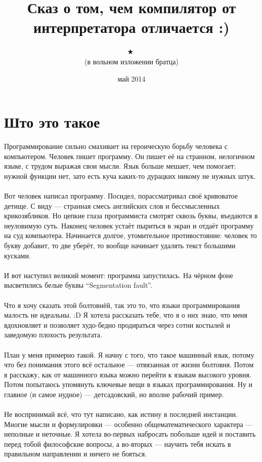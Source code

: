 \documentclass[11pt]{book}
\title{
\small{\textleaf}
\huge{\textleaf}
\huge{\quad}
\large{Сказ о том, чем компилятор от интерпретатора отличается :)}
\huge{\quad}
\huge{\textleaf}
\small{\textleaf}
}
\author{
\small{\textborn} \ 
\small{\APLstar} \ 
\huge{\textborn} \ 
\huge{\APLstar} \ 
\Huge{$\bigstar$} \ 
\huge{\APLstar} \ 
\huge{\textborn} \ 
\small{\APLstar} \ 
\small{\textborn}
\\
\Large (в вольном изложении братца)
\\
\huge{\Bicycle}
}
\date{май 2014}
\begin{document}
\maketitle
\pagebreak

\section*{Што это такое}
Программирование сильно смахивает на героическую борьбу человека с компьютером.
Человек пишет программу. Он пишет её на странном, нелогичном языке, с трудом выражая
свои мысли. Язык больше мешает, чем помогает: нужной функции нет, зато есть
куча каких-то дурацких никому не нужных штук.
\\ \\
Вот человек написал программу. Посидел, порассматривал своё кривоватое детище.
С виду --- странная смесь английских слов и бессмысленных крикозябликов.
Но цепкие глаза программиста смотрят сквозь буквы, въедаются
в неуловимую суть. Наконец человек устаёт пыриться в экран и отдаёт программу
на суд компьютера. Начинается долгое, утомительное противостояние: человек
то букву добавит, то две уберёт, то вообще начинает удалять текст большими кусками.
\\ \\
И вот наступил великий момент: программа запустилась. На чёрном фоне
высветились белые буквы ``Segmentation fault''.
\\ \\
Что я хочу сказать этой болтовнёй, так это то, что языки программирования малость не идеальны. :D
Я хотела рассказать тебе, что я о них знаю, что меня вдохновляет
и позволяет худо-бедно продираться через сотни костылей и заведомую плохость результата.
\\ \\
План у меня примерно такой.
Я начну с того, что такое машинный язык, потому что без понимания этого всё остальное --- отвязанная от жизни болтовня.
Потом я расскажу, как от машинного языка можно перейти к языкам высокого уровня.
Потом попытаюсь упомянуть ключевые вещи в языках программирования.
Ну и главное (и самое нудное) --- детсадовский, но вполне рабочий пример.
\\ \\
Не воспринимай всё, что тут написано, как истину в последней инстанции.
Многие мысли и формулировки --- особенно общематематического характера --- неполные и неточные.
Я хотела во-первых набросать побольше идей и поставить перед тобой философские вопросы,
а во-вторых --- научить тебя искать в правильном направлении и ничего не бояться.
\end{document}
